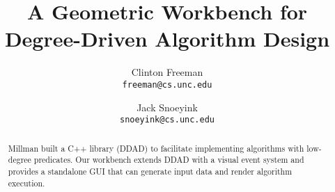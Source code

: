 \documentclass{article}
\title{A Geometric Workbench for Degree-Driven Algorithm Design}
\author{
        Clinton Freeman \\
        \texttt{freeman@cs.unc.edu}
        \and
        Jack Snoeyink \\
    \texttt{snoeyink@cs.unc.edu}
}
\theoremstyle{definition}
\begin{document}
\maketitle


\begin{abstract}
Millman built a C++ library (DDAD) to facilitate implementing algorithms with
low-degree predicates. Our workbench extends DDAD with a visual event system and
provides a standalone GUI that can generate input data and render algorithm
execution.
\end{abstract}














 


\end{document}

